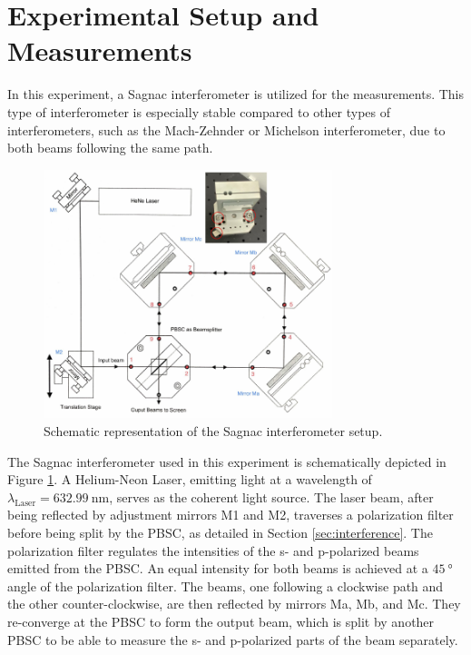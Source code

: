 \section{Experimental Setup and Measurements}
\label{sec:procedure}
In this experiment, a Sagnac interferometer is utilized for the measurements. 
This type of interferometer is especially stable compared to other types
of interferometers, such as the Mach-Zehnder or Michelson interferometer, due to
both beams following the same path.

\begin{figure}
    \centering
    \includegraphics[width=0.75\textwidth]{pictures/Sagnac.png}
    \caption{Schematic representation of the Sagnac interferometer setup. \cite{V64}}
    \label{fig:sagnac}
\end{figure}

The Sagnac interferometer used in this experiment is schematically depicted in Figure \ref{fig:sagnac}. 
A Helium-Neon Laser, emitting light at a wavelength of $\lambda_\text{Laser} = \SI{632.99}{\nano\meter}$, 
serves as the coherent light source. The laser beam, after being reflected by adjustment mirrors M1 and M2, 
traverses a polarization filter before being split by the PBSC, as detailed 
in Section \ref{sec:interference}. The polarization filter regulates the intensities of the s- and p-polarized 
beams emitted from the PBSC. An equal intensity for both beams is achieved at a $\SI{45}{\degree}$ angle 
of the polarization filter. The beams, one following a clockwise path and the other counter-clockwise, are
then reflected by mirrors Ma, Mb, and Mc.
They re-converge at the PBSC to form the output beam, 
which is split by another PBSC to be able to measure 
the s- and p-polarized parts of the beam separately.

